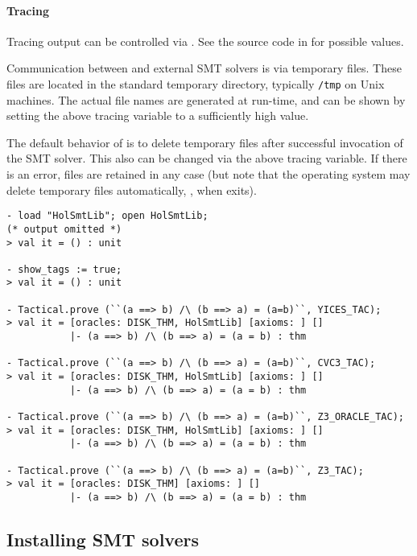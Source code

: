 \paragraph{Tracing}

Tracing output can be controlled via .  See the source code in  for
possible values.

Communication between \HOL{} and external SMT solvers is via temporary
files.  These files are located in the standard temporary directory,
typically {\tt /tmp} on Unix machines.  The actual file names are
generated at run-time, and can be shown by setting the above tracing
variable to a sufficiently high value.

The default behavior of  is to delete temporary files
after successful invocation of the SMT solver.  This also can be
changed via the above tracing variable.  If there is an error, files
are retained in any case (but note that the operating system may
delete temporary files automatically, \eg, when \HOL{} exits).

\begin{session}
\begin{verbatim}
- load "HolSmtLib"; open HolSmtLib;
(* output omitted *)
> val it = () : unit

- show_tags := true;
> val it = () : unit

- Tactical.prove (``(a ==> b) /\ (b ==> a) = (a=b)``, YICES_TAC);
> val it = [oracles: DISK_THM, HolSmtLib] [axioms: ] []
           |- (a ==> b) /\ (b ==> a) = (a = b) : thm

- Tactical.prove (``(a ==> b) /\ (b ==> a) = (a=b)``, CVC3_TAC);
> val it = [oracles: DISK_THM, HolSmtLib] [axioms: ] []
           |- (a ==> b) /\ (b ==> a) = (a = b) : thm

- Tactical.prove (``(a ==> b) /\ (b ==> a) = (a=b)``, Z3_ORACLE_TAC);
> val it = [oracles: DISK_THM, HolSmtLib] [axioms: ] []
           |- (a ==> b) /\ (b ==> a) = (a = b) : thm

- Tactical.prove (``(a ==> b) /\ (b ==> a) = (a=b)``, Z3_TAC);
> val it = [oracles: DISK_THM] [axioms: ] []
           |- (a ==> b) /\ (b ==> a) = (a = b) : thm
\end{verbatim}
\end{session}

\subsection{Installing SMT solvers}


